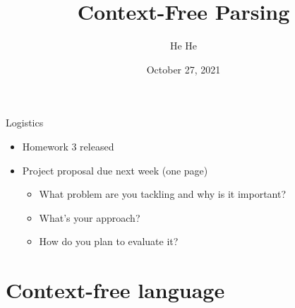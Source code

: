 \documentclass[usenames,dvipsnames,notes,11pt,aspectratio=169]{beamer}
\title[CSCI-GA.2590]{Context-Free Parsing}
\author[He He]{He He
}
\institute[NYU]{New York University}
\date{October 27, 2021}
\begin{document}
\begin{frame}
\titlepage
\end{frame}

\begin{frame}
    {Logistics}
    \begin{itemize}
        \item Homework 3 released
        \item Project proposal due next week (one page) 
            \begin{itemize}
                \item What problem are you tackling and why is it important?
                \item What's your approach? 
                \item How do you plan to evaluate it? 
            \end{itemize}
    \end{itemize}
\end{frame}

\section{Context-free language}
\end{document}
